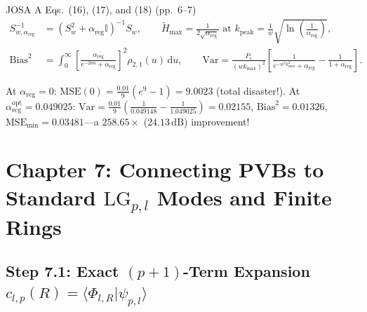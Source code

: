 \documentclass[10pt,letterpaper]{article}
\newcommand{\braket}[2]{\langle #1 | #2 \rangle}
\newcommand{\dd}{\mathrm{d}}
\numberwithin{equation}{section}
\begin{document}
\begin{paperhit}{JOSA A Eqs.~(16), (17), and (18) (pp.~6--7)}
\begin{align*}
  S_{w,\alpha_{\mathrm{reg}}}^{-1} &= (S_w^2 + \alpha_{\mathrm{reg}}\mathbb{I})^{-1}S_w, \qquad
  \widetilde{H}_{\max} = \frac{1}{2\sqrt{\alpha_{\mathrm{reg}}}}\text{ at } k_{\mathrm{peak}} = \frac{1}{w}\sqrt{\ln\!\left(\frac{1}{\alpha_{\mathrm{reg}}}\right)}, \\
  \mathrm{Bias}^2 &= \int_0^\infty\left[\frac{\alpha_{\mathrm{reg}}}{e^{-2au}+\alpha_{\mathrm{reg}}}\right]^2\rho_{2,1}(u)\,\dd u, \qquad
  \mathrm{Var} = \frac{P_\varepsilon}{(wk_{\max})^2}\left[\frac{1}{e^{-w^2 k_{\max}^2}+\alpha_{\mathrm{reg}}} - \frac{1}{1+\alpha_{\mathrm{reg}}}\right].
\end{align*}
\end{paperhit}

\begin{pencilbox}[Check the $258.65\times$ Deconvolution Gain by Hand ($wk_{\max} = 3.0$, $P_\varepsilon = 0.01$)]
At $\alpha_{\mathrm{reg}} = 0$: $\mathrm{MSE}(0) = \frac{0.01}{9}(e^9 - 1) = \mathbf{9.0023}$ (total disaster!). At $\alpha_{\mathrm{reg}}^{\mathrm{opt}} = 0.049025$: $\mathrm{Var} = \frac{0.01}{9}(\frac{1}{0.049148} - \frac{1}{1.049025}) = 0.02155$, $\mathrm{Bias}^2 = 0.01326$, $\mathrm{MSE}_{\min} = \mathbf{0.03481}$---a $\mathbf{258.65\times}$ ($\mathbf{24.13\,\mathrm{dB}}$) improvement!
\end{pencilbox}

\section{Chapter 7: Connecting PVBs to Standard $\mathrm{LG}_{p,l}$ Modes and Finite Rings}
\label{sec:c7}

\subsection{Step 7.1: Exact $(p+1)$-Term Expansion $c_{l,p}(R) = \braket{\Phi_{l,R}}{\psi_{p,l}}$}
\end{document}
